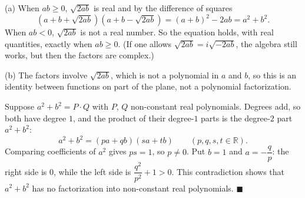 (a) When $ab\ge0$, $\sqrt{2ab}$ is real and by the difference of squares
\[
\left(a+b+\sqrt{2ab}\right)\left(a+b-\sqrt{2ab}\right)=(a+b)^2-2ab=a^2+b^2 .
\]
When $ab<0$, $\sqrt{2ab}$ is not a real number. So the equation holds, with real quantities, exactly when $\boxed{ab\ge0}$. (If one allows $\sqrt{2ab}=i\sqrt{-2ab}$, the algebra still works, but then the factors are complex.)

(b) The factors involve $\sqrt{2ab}$, which is not a polynomial in $a$ and $b$, so this is an identity between functions on part of the plane, not a polynomial factorization.

Suppose $a^2+b^2=P\cdot Q$ with $P$, $Q$ non-constant real polynomials. Degrees add, so both have degree $1$, and the product of their degree-$1$ parts is the degree-$2$ part $a^2+b^2$:
\[
a^2+b^2=(pa+qb)(sa+tb)\qquad(p,q,s,t\in\mathbb R).
\]
Comparing coefficients of $a^2$ gives $ps=1$, so $p\ne0$. Put $b=1$ and $a=-\dfrac {q}{p}$: the right side is $0$, while the left side is $\dfrac{q^2}{p^2}+1>0$. This contradiction shows that $a^2+b^2$ has no factorization into non-constant real polynomials. $\blacksquare$
